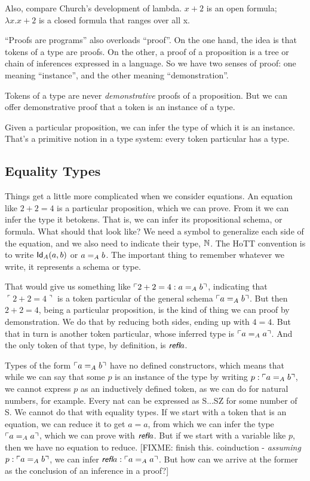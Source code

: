 \documentclass{article}
\begin{document}
Also, compare Church's development of lambda. \(x+2\) is an open
formula; \(\lambda x.x+2\) is a closed formula that ranges over all x.

``Proofs are programs'' also overloads ``proof''. On the one hand, the
idea is that tokens of a type are proofs. On the other, a proof of a
proposition is a tree or chain of inferences expressed in a language.
So we have two senses of proof: one meaning ``instance'', and the
other meaning ``demonstration''.

Tokens of a type are never \textit{demonstrative} proofs of a
proposition. But we can offer demonstrative proof that a token is an
instance of a type.

Given a particular proposition, we can infer the type of which it is
an instance. That's a primitive notion in a type system: every token
particular has a type.

\subsection{Equality Types}

Things get a little more complicated when we consider equations. An
equation like \(2+2=4\) is a particular proposition, which we can
prove. From it we can infer the type it betokens. That is, we can
infer its propositional schema, or formula. What should that look
like? We need a symbol to generalize each side of the equation, and we
also need to indicate their type, \(\Nat\). The HoTT convention is to
write \(\Id{A}{a}{b}\) or \(\Eq{A}{a}{b}\). The important thing to
remember whatever we write, it represents a schema or type.

That would give us something like \(\ulcorner 2+2=4 :
\Eq{A}{a}{b}\urcorner\), indicating that \(\ulcorner 2+2=4\urcorner\)
is a token particular of the general schema
\(\ulcorner\Eq{A}{a}{b}\urcorner\). But then \(2+2=4\), being a
particular proposition, is the kind of thing we can proof by
demonstration. We do that by reducing both sides, ending up with
\(4=4\). But that in turn is another token particular, whose inferred
type is \(\ulcorner\Eq{A}{a}{a}\urcorner\). And the only token of that
type, by definition, is \(\refl{a}\).

Types of the form \(\ulcorner\Eq{A}{a}{b}\urcorner\) have no defined
constructors, which means that while we can say that some \(p\) is an
instance of the type by writing \(p:\ulcorner\Eq{A}{a}{b}\urcorner\),
we cannot express \(p\) as an inductively defined token, as we can do
for natural numbers, for example. Every nat can be expressed as S...SZ
for some number of S. We cannot do that with equality types. If we
start with a token that is an equation, we can reduce it to get
\(a=a\), from which we can infer the type
\(\ulcorner\Eq{A}{a}{a}\urcorner\), which we can prove with
\(\refl{a}\). But if we start with a variable like \(p\), then we have
no equation to reduce. [FIXME: finish this. coinduction -
  \textit{assuming} \(p:\ulcorner\Eq{A}{a}{b}\urcorner\), we can infer
  \(\refl{a}:\ulcorner\Eq{A}{a}{a}\urcorner\). But how can we arrive
  at the former as the conclusion of an inference in a proof?]
\end{document}
